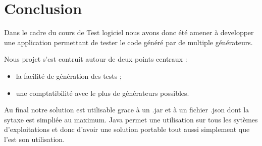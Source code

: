 \chapter*{Conclusion}

Dans le cadre du cours de Test logiciel nous avons donc été amener à developper
une application permettant de tester le code généré par de multiple générateurs.

Nous projet s'est contruit autour de deux points centraux :

\begin{itemize}
    \item la facilité de génération des tests ;
    \item une comptatibilité avec le plus de générateurs possibles.
\end{itemize}

Au final notre solution est utilisable grace à un .jar et à un fichier .json dont
la sytaxe est simpliée au maximum. Java permet une utilisation sur tous les
sytèmes d'exploitations et donc d'avoir une solution portable tout aussi simplement
que l'est son utilisation.

